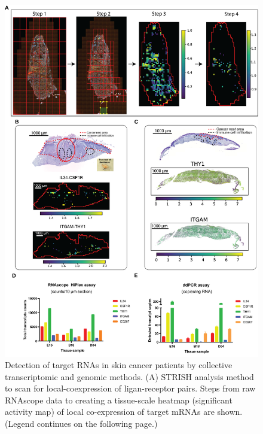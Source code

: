 \begin{figure}[htp]
    \centering
    \includegraphics[width=0.95\columnwidth]{Chapter2/Figures/Chapter2_Fig2.png}
    \caption[Detection of target RNAs in skin cancer patients by collective transcriptomic and genomic methods.]{ Detection of target RNAs in skin cancer patients by collective transcriptomic and genomic methods. (A) STRISH analysis method to scan for local-coexpression of ligan-receptor pairs. Steps from raw RNAscope data to creating a tissue-scale heatmap (significant activity map) of local co-expression of target mRNAs are shown. (Legend continues on the following page.) }
    \label{fig:Chap2_figure2}
\end{figure}

